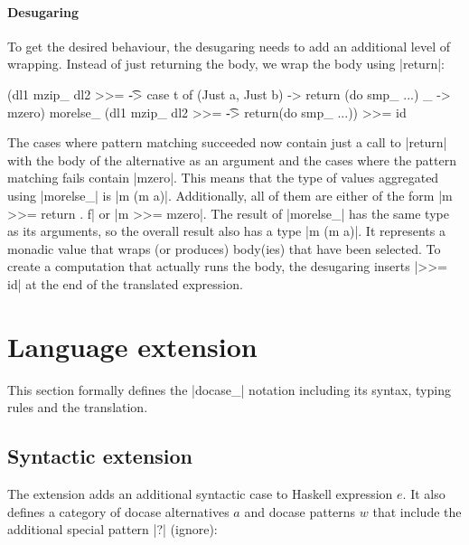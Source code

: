 \documentclass{sigplanconf}
\begin{document}
\paragraph{Desugaring} To get the desired behaviour, the desugaring needs to add an additional
level of wrapping. Instead of just returning the body, we wrap the body using |return|:

\begin{code}
(dl1 mzip_ dl2 >>= \t -> case t of 
    (Just a, Just b) -> return (do smp_ ...)
    _ -> mzero) morelse_
(dl1 mzip_ dl2 >>= \t -> 
    return(do smp_ ...)) >>= id
\end{code}
The cases where pattern matching succeeded now contain just a call to |return| with the body
of the alternative as an argument and the cases where the pattern matching fails contain |mzero|.
This means that the type of values aggregated using |morelse_| is |m (m a)|. Additionally,
all of them are either of the form |m >>= return . f| or |m >>= mzero|.
The result of |morelse_| has the same type as its arguments, so the overall result also has a type
|m (m a)|. It represents a monadic value that wraps (or produces) body(ies) that have
been selected. To create a computation that actually runs the body, the desugaring inserts 
|>>= id| at the end of the translated expression. 


\section{Language extension}
\label{sec:extension}

This section formally defines the |docase_| notation including its syntax, typing rules and the 
translation. 


\subsection{Syntactic extension}
\label{sec:extension-syntax}

The extension adds an additional syntactic case to Haskell expression $e$. It also 
defines a category of docase alternatives $a$ and docase patterns $w$ that include 
the additional special pattern |?| (ignore):
\end{document}
